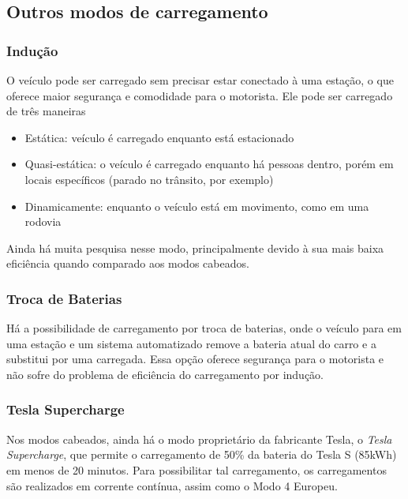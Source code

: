     \subsection{Outros modos de carregamento}

      \subsubsection{Indução}

        O veículo pode ser carregado sem precisar estar conectado à uma estação, o que oferece maior segurança e comodidade para o motorista. Ele pode ser carregado de três maneiras

        \begin{itemize}
          \item Estática: veículo é carregado enquanto está estacionado
          \item Quasi-estática: o veículo é carregado enquanto há pessoas dentro, porém em locais específicos (parado no trânsito, por exemplo)
          \item Dinamicamente: enquanto o veículo está em movimento, como em uma rodovia
        \end{itemize}

        Ainda há muita pesquisa nesse modo, principalmente devido à sua mais baixa eficiência quando comparado aos modos cabeados.

      \subsubsection{Troca de Baterias}

        Há a possibilidade de carregamento por troca de baterias, onde o veículo para em uma estação e um sistema automatizado remove a bateria atual do carro e a substitui por uma carregada. Essa opção oferece segurança para o motorista e não sofre do problema de eficiência do carregamento por indução.

      \subsubsection{Tesla Supercharge}

        Nos modos cabeados, ainda há o modo proprietário da fabricante Tesla, o \textit{Tesla Supercharge}, que permite o carregamento de 50\% da bateria do Tesla S (85kWh) em menos de 20 minutos. Para possibilitar tal carregamento, os carregamentos são realizados em corrente contínua, assim como o Modo 4 Europeu.

